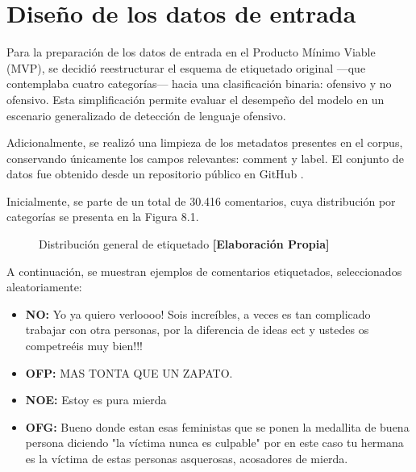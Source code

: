 \chapter{Diseño de los datos de entrada}

Para la preparación de los datos de entrada en el Producto Mínimo Viable (MVP), se decidió reestructurar el esquema de etiquetado original —que contemplaba cuatro categorías— hacia una clasificación binaria: ofensivo y no ofensivo. Esta simplificación permite evaluar el desempeño del modelo en un escenario generalizado de detección de lenguaje ofensivo.

Adicionalmente, se realizó una limpieza de los metadatos presentes en el corpus, conservando únicamente los campos relevantes: comment y label. El conjunto de datos fue obtenido desde un repositorio público en GitHub \cite{fmplaza2025github}.

Inicialmente, se parte de un total de 30.416 comentarios, cuya distribución por categorías se presenta en la Figura 8.1.

\begin{figure}[h!]
    \centering
    \caption{Distribución general de etiquetado \textbf{[Elaboración Propia]}}
\end{figure}

A continuación, se muestran ejemplos de comentarios etiquetados, seleccionados aleatoriamente:

\begin{itemize}
    \item \textbf{NO:} Yo ya quiero verloooo! Sois increíbles, a veces es tan complicado trabajar con otra personas, por la diferencia de ideas ect y ustedes os competreéis muy bien!!!
    \item \textbf{OFP:} MAS TONTA QUE UN ZAPATO.
    \item \textbf{NOE:} Estoy es pura mierda
\end{itemize}



\vspace{0.5cm}

\begin{itemize}
    \item \textbf{OFG:} Bueno donde estan esas feministas que se ponen la medallita de buena persona diciendo "la víctima nunca es culpable" por en este caso tu hermana es la víctima de estas personas asquerosas, acosadores de mierda.
\end{itemize}

